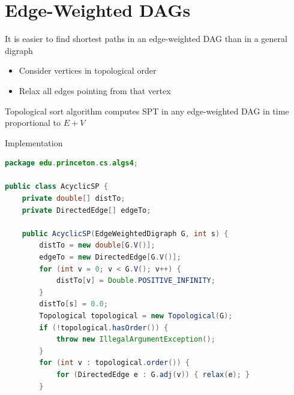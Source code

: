 \documentclass[8pt,a4paper,compress]{beamer}
\begin{document}
\section{Edge-Weighted DAGs}
\begin{frame}[fragile]
It is easier to find shortest paths in an edge-weighted DAG than in a general digraph
\begin{itemize}
\item Consider vertices in topological order

\item Relax all edges pointing from that vertex
\end{itemize}

\bigskip

Topological sort algorithm computes SPT in any edge-weighted DAG in time proportional to $E + V$

\bigskip

Implementation
\begin{lstlisting}[language=Java]
package edu.princeton.cs.algs4;

public class AcyclicSP {
    private double[] distTo; 
    private DirectedEdge[] edgeTo; 
    
    public AcyclicSP(EdgeWeightedDigraph G, int s) {
        distTo = new double[G.V()];
        edgeTo = new DirectedEdge[G.V()];
        for (int v = 0; v < G.V(); v++) {
            distTo[v] = Double.POSITIVE_INFINITY;
        }
        distTo[s] = 0.0;
        Topological topological = new Topological(G);
        if (!topological.hasOrder()) { 
            throw new IllegalArgumentException(); 
        }
        for (int v : topological.order()) {
            for (DirectedEdge e : G.adj(v)) { relax(e); }
        }
\end{lstlisting}
\end{frame}
\end{document}
